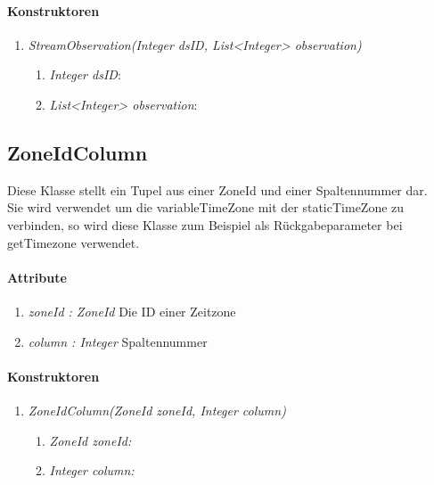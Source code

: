 \paragraph{Konstruktoren}
\begin{enumerate}[+]
	\item \textit{StreamObservation(Integer dsID, List<Integer> observation)} \\
	
	\begin{enumerate}[$\bullet$]
		\item \textit{Integer dsID}:
		\item \textit{List<Integer> observation}:
	\end{enumerate}
\end{enumerate}






\subsection{ZoneIdColumn}
Diese Klasse stellt ein Tupel aus einer ZoneId und einer Spaltennummer dar.\\
Sie wird verwendet um die variableTimeZone mit der staticTimeZone zu verbinden, so wird diese Klasse zum Beispiel als Rückgabeparameter bei getTimezone verwendet.

\paragraph{Attribute}
\begin{enumerate}[-]
	\item \textit{zoneId : ZoneId} Die ID einer Zeitzone
	\item \textit{column : Integer} Spaltennummer
\end{enumerate}

\paragraph{Konstruktoren}
\begin{enumerate}[+]
	\item \textit{ZoneIdColumn(ZoneId zoneId, Integer column)} \\
	
	\begin{enumerate}[$\bullet$]
		\item \textit{ZoneId zoneId:} 
		\item \textit{Integer column:} 
	\end{enumerate}
\end{enumerate}












